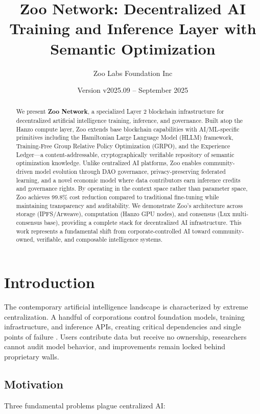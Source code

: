 \documentclass[11pt,a4paper]{article}
\title{\textbf{Zoo Network: Decentralized AI Training and Inference Layer with Semantic Optimization}}
\author[1]{Zoo Labs Foundation Inc}
\affil[1]{A 501(c)(3) Non-Profit Organization, \texttt{zoo.ngo}}
\date{Version v2025.09 -- September 2025}
\begin{document}
\maketitle

\begin{abstract}
We present \textbf{Zoo Network}, a specialized Layer 2 blockchain infrastructure for decentralized artificial intelligence training, inference, and governance. Built atop the Hanzo compute layer, Zoo extends base blockchain capabilities with AI/ML-specific primitives including the Hamiltonian Large Language Model (HLLM) framework, Training-Free Group Relative Policy Optimization (GRPO), and the Experience Ledger—a content-addressable, cryptographically verifiable repository of semantic optimization knowledge. Unlike centralized AI platforms, Zoo enables community-driven model evolution through DAO governance, privacy-preserving federated learning, and a novel economic model where data contributors earn inference credits and governance rights. By operating in the context space rather than parameter space, Zoo achieves 99.8\% cost reduction compared to traditional fine-tuning while maintaining transparency and auditability. We demonstrate Zoo's architecture across storage (IPFS/Arweave), computation (Hanzo GPU nodes), and consensus (Lux multi-consensus base), providing a complete stack for decentralized AI infrastructure. This work represents a fundamental shift from corporate-controlled AI toward community-owned, verifiable, and composable intelligence systems.
\end{abstract}

\section{Introduction}

The contemporary artificial intelligence landscape is characterized by extreme centralization. A handful of corporations control foundation models, training infrastructure, and inference APIs, creating critical dependencies and single points of failure \cite{bender2021dangers}. Users contribute data but receive no ownership, researchers cannot audit model behavior, and improvements remain locked behind proprietary walls.

\subsection{Motivation}

Three fundamental problems plague centralized AI:
\end{document}
